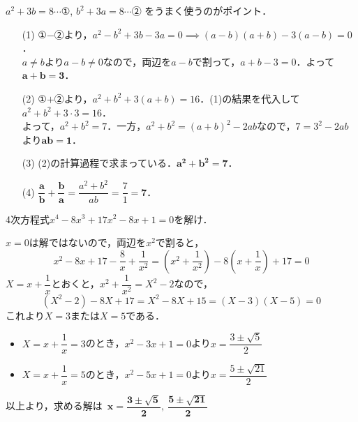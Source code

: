 \documentclass[a4paper,11pt]{ltjsarticle}
\begin{document}
\ans 
$a^2+3b=8 \cdots$①, $b^2+3a=8 \cdots$② をうまく使うのがポイント．
\begin{itemize}
    \item [(1)] ①$-$②より，$a^2-b^2+3b-3a=0 \implies (a-b)(a+b)-3(a-b)=0$．\\
    $a\neq b$より$a-b\neq 0$なので，両辺を$a-b$で割って，$a+b-3=0$．よって$\boldsymbol{a+b=3}$．
    \item [(2)] ①$+$②より，$a^2+b^2+3(a+b)=16$．(1)の結果を代入して $a^2+b^2+3\cdot3=16$．\\
    よって，$a^2+b^2=7$．一方，$a^2+b^2=(a+b)^2-2ab$なので，$7=3^2-2ab $より$\boldsymbol{ab=1}$．
    \item [(3)] (2)の計算過程で求まっている．$\boldsymbol{a^2+b^2=7}$．
    \item [(4)] $\boldsymbol{\dfrac{a}{b}+\dfrac{b}{a}}=\dfrac{a^2+b^2}{ab}=\dfrac{7}{1}=\boldsymbol{7}$．
\end{itemize}
\begin{toi}
4次方程式$x^4-8x^3+17x^2-8x+1=0$を解け．\rightline{[2020~横浜市大　医]}
\end{toi}
\ans $x=0$は解ではないので，両辺を$x^2$で割ると，
\[x^2-8x+17-\frac8x+\frac{1}{x^2}=\left(x^2+\frac{1}{x^2}\right)-8\left(x+\frac1x\right)+17=0\]
$X=x+\dfrac1x$とおくと，$x^2+\dfrac{1}{x^2}=X^2-2$なので，
\[(X^2-2)-8X+17=X^2-8X+15=(X-3)(X-5)=0\]
これより$X=3$または$X=5$である．
\begin{itemize}
    \item $X=x+\dfrac1x=3$のとき，$x^2-3x+1=0$より$x=\dfrac{3\pm\sqrt{5}}{2}$
    \item $X=x+\dfrac1x=5$のとき，$x^2-5x+1=0$より$x=\dfrac{5\pm\sqrt{21}}{2}$
\end{itemize}
以上より，求める解は~$\boldsymbol{x=\dfrac{3\pm\sqrt5}{2},~\dfrac{5\pm\sqrt{21}}{2}}$
\end{document}
